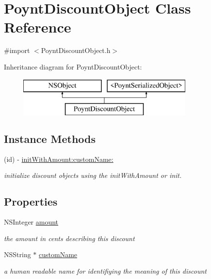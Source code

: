 \hypertarget{interface_poynt_discount_object}{}\section{Poynt\+Discount\+Object Class Reference}
\label{interface_poynt_discount_object}


{\ttfamily \#import $<$Poynt\+Discount\+Object.\+h$>$}

Inheritance diagram for Poynt\+Discount\+Object\+:\begin{figure}[H]
\begin{center}
\leavevmode
\includegraphics[height=2.000000cm]{interface_poynt_discount_object}
\end{center}
\end{figure}
\subsection*{Instance Methods}
\begin{DoxyCompactItemize}
\item 
(id) -\/ \hyperlink{interface_poynt_discount_object_aca2778db881b6bf8745ee57b1d4e7639}{init\+With\+Amount\+:custom\+Name\+:}
\begin{DoxyCompactList}\small\item\em initialize discount objects using the init\+With\+Amount or init. \end{DoxyCompactList}\end{DoxyCompactItemize}
\subsection*{Properties}
\begin{DoxyCompactItemize}
\item 
N\+S\+Integer \hyperlink{interface_poynt_discount_object_a6ff5079a7aa518c578773da69959732d}{amount}
\begin{DoxyCompactList}\small\item\em the amount in cents describing this discount \end{DoxyCompactList}\item 
N\+S\+String $\ast$ \hyperlink{interface_poynt_discount_object_ae38352d9ec7d2d1f03df4d4646c1a641}{custom\+Name}
\begin{DoxyCompactList}\small\item\em a human readable name for identifiying the meaning of this discount \end{DoxyCompactList}\end{DoxyCompactItemize}



